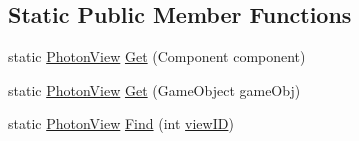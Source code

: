 \subsection*{Static Public Member Functions}
\begin{DoxyCompactItemize}
\item 
static \hyperlink{class_photon_view}{Photon\+View} \hyperlink{class_photon_view_ace8c64cae230e1fbd3356112274e4d8d}{Get} (Component component)
\item 
static \hyperlink{class_photon_view}{Photon\+View} \hyperlink{class_photon_view_a24370932ff0a1f79d6dcb83a2bd7a27b}{Get} (Game\+Object game\+Obj)
\item 
static \hyperlink{class_photon_view}{Photon\+View} \hyperlink{class_photon_view_a84084cfaf09debaf88362629bb772907}{Find} (int \hyperlink{class_photon_view_a309ddedb443400696cf80da2ff579262}{view\+ID})
\end{DoxyCompactItemize}
